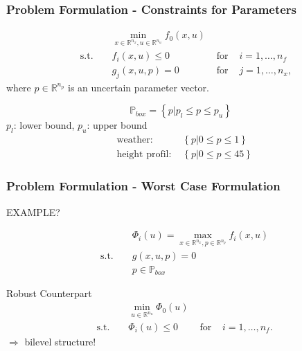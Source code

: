 

\begin{frame}
\frametitle{Problem Formulation - Constraints for Parameters}

\begin{block}
	
\begin{align*}
 &&& \min_{x\in \mathbb{R}^{n_{x}}, u\in \mathbb{R}^{n_{u}}}  f_{0}(x, u)\\
& \text{ s.t. } &&  f_{i}(x,u) \leq 0 & \text{ for } & i=1,\ldots,n_{f}\\
&&&  g_{j}(x,u,p)=0 & \text{ for } & j=1,\ldots,n_{x},
\end{align*}
where $p\in \mathbb{R}^{n_{p}}$ is an uncertain parameter vector.

\end{block}


\begin{block}

\begin{equation*}
\mathbb{P}_{box}=\left\{\left. p \right| p_{l}\leq p \leq p_{u}\right\}
\end{equation*}
$p_{l}$: lower bound, $p_{u}$: upper bound
\begin{align*}
& \text{weather: }  & \left\{\left. p \right| 0\leq p\leq 1\right\} \\
& \text{height profil: } & \left\{\left. p \right| 0\leq p\leq 45\right\}
\end{align*}


\end{block}


\end{frame}


\begin{frame}
\frametitle{Problem Formulation - Worst Case Formulation}

EXAMPLE?

\begin{align*}
&&&\Phi_{i}(u)=\max_{x\in \mathbb{R}^{n_{x}}, p\in \mathbb{R}^{n_{p}}} f_{i}(x,u)\\
	& \text{s.t. } && g(x,u,p)=0\\
	&&& p\in\mathbb{P}_{box}
\end{align*}

\begin{block}{Robust Counterpart}
\begin{align*}
&&&\min_{u\in\mathbb{R}^{n_{u}}} \Phi_{0}(u)\\
&\text{s.t. } &&\Phi_{i}(u)\leq 0 & \text{ for } & i=1,\ldots,n_{f}.
\end{align*}
$\Rightarrow$ bilevel structure!
\end{block}

\end{frame}

